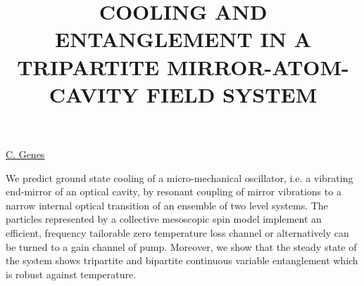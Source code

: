 \title{COOLING AND ENTANGLEMENT IN A TRIPARTITE MIRROR-ATOM-CAVITY FIELD SYSTEM}

\underline{C. Genes}


We predict ground state cooling of a micro-mechanical oscillator, i.e. a
vibrating end-mirror of an optical cavity, by resonant coupling of mirror
vibrations to a narrow internal optical transition of an ensemble of two level
systems. The particles represented by a collective mesoscopic spin model
implement an efficient, frequency tailorable zero temperature loss channel
or alternatively can be turned to a gain channel of pump. Moreover, we show that
the steady state of the system shows tripartite and bipartite continuous
variable entanglement which is robust against temperature.

\vspace{\baselineskip}